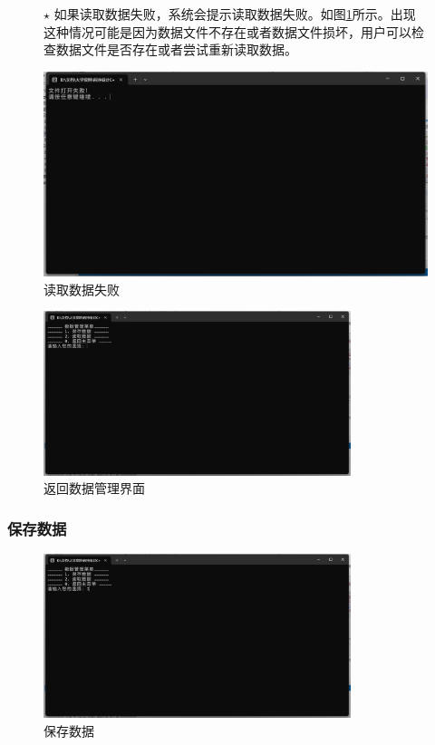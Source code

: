 \documentclass[12pt,twoside]{ctexart}
\begin{document}
\begin{figure}[H]
    \begin{minipage}[c]{0.5\textwidth}
        $\star$ 如果读取数据失败，系统会提示读取数据失败。如图\ref{fig:ReadFailed}所示。出现这种情况可能是因为数据文件不存在或者数据文件损坏，用户可以检查数据文件是否存在或者尝试重新读取数据。
    \end{minipage}%
    \hfill
    \begin{minipage}[c]{0.45\textwidth}
        \centering
        \includegraphics[width=\textwidth]{ReadFailed.png}
        \caption{读取数据失败}
        \label{fig:ReadFailed}
    \end{minipage}
\end{figure}

\begin{figure}[H]
    \centering
    \includegraphics[width=0.8\textwidth]{ReadReturn.png}
    \caption{返回数据管理界面}
\end{figure}

\subsubsection{保存数据}
\begin{figure}[H]
    \centering
    \includegraphics[width=0.8\textwidth]{SaveData.png}
    \caption{保存数据}
\end{figure}
\end{document}
